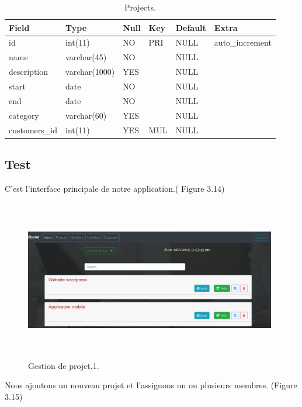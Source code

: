 \begin{table}

\begin{tabular}{|l|l|l|l|l|l|}
\hline
Field         & Type          & Null & Key & Default & Extra            \\
\hline
id            & int(11)       & NO   & PRI & NULL    & auto\_increment  \\
\hline
name          & varchar(45)   & NO   &     & NULL    &                  \\
\hline
description   & varchar(1000) & YES  &     & NULL    &                  \\
\hline
start         & date          & NO   &     & NULL    &                  \\
\hline
end           & date          & NO   &     & NULL    &                  \\
\hline
category      & varchar(60)   & YES  &     & NULL    &                  \\
\hline
customers\_id & int(11)       & YES  & MUL & NULL    &                  \\
\hline
\end{tabular}
\centering
 \caption {Projects.}
\end{table}


\subsection{Test}
C'est l'interface principale de notre application.( Figure 3.14)

\begin{figure}[H]
\center
\includegraphics[width=11cm,height=7cm]{./figures/pres/gp1.png}
\caption{Gestion de projet.1.}
\end{figure}


Nous ajoutons un nouveau projet et l'assignons un ou plusieurs membres. (Figure 3.15)

